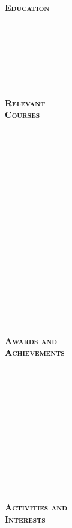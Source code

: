 \documentclass[12pt]{article}
\begin{document}
\begin{minipage}[t]{0.2\linewidth} 
	\textbf{\textsc{
	\hspace{-5pt}Education \\ \\ \\ \\ \\ \\ \\ \\
	Relevant \\ Courses \\ \\ \\ \\ \\ \\ \\ \\ \\ \\ \\ \\ \\ \\ \\ \\ \\ \\ \\ 
	Awards and \\ Achievements \\ \\ \\ \\ \\ \\ \\ \\ \\ \\ \\ \\ \\
	Activities and\\ Interests
	}}
\end{minipage}
\end{document}
